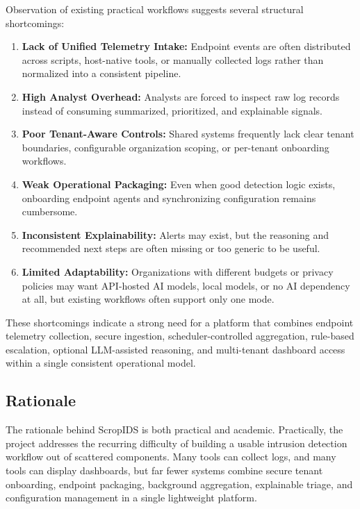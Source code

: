 \documentclass[12pt,a4paper]{article}
\begin{document}
Observation of existing practical workflows suggests several structural shortcomings:

\begin{enumerate}
    \item \textbf{Lack of Unified Telemetry Intake:} Endpoint events are often distributed across scripts, host-native tools, or manually collected logs rather than normalized into a consistent pipeline.
    \item \textbf{High Analyst Overhead:} Analysts are forced to inspect raw log records instead of consuming summarized, prioritized, and explainable signals.
    \item \textbf{Poor Tenant-Aware Controls:} Shared systems frequently lack clear tenant boundaries, configurable organization scoping, or per-tenant onboarding workflows.
    \item \textbf{Weak Operational Packaging:} Even when good detection logic exists, onboarding endpoint agents and synchronizing configuration remains cumbersome.
    \item \textbf{Inconsistent Explainability:} Alerts may exist, but the reasoning and recommended next steps are often missing or too generic to be useful.
    \item \textbf{Limited Adaptability:} Organizations with different budgets or privacy policies may want API-hosted AI models, local models, or no AI dependency at all, but existing workflows often support only one mode.
\end{enumerate}

These shortcomings indicate a strong need for a platform that combines endpoint telemetry collection, secure ingestion, scheduler-controlled aggregation, rule-based escalation, optional LLM-assisted reasoning, and multi-tenant dashboard access within a single consistent operational model.

\subsection{Rationale}
The rationale behind ScropIDS is both practical and academic. Practically, the project addresses the recurring difficulty of building a usable intrusion detection workflow out of scattered components. Many tools can collect logs, and many tools can display dashboards, but far fewer systems combine secure tenant onboarding, endpoint packaging, background aggregation, explainable triage, and configuration management in a single lightweight platform.
\end{document}
